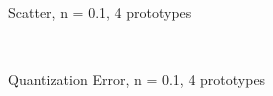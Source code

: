 \documentclass[10pt,a4paper]{article}
\begin{document}
\begin{figure}
  \centering
{} \\
  \caption{Scatter, n = 0.1, 4 prototypes}
  \label{fig:n01_k4}
\end{figure}

\begin{figure}
  \centering
{} \\
  \caption{Quantization Error, n = 0.1, 4 prototypes}
  \label{fig:n01_k4_learning}
\end{figure}
\end{document}
